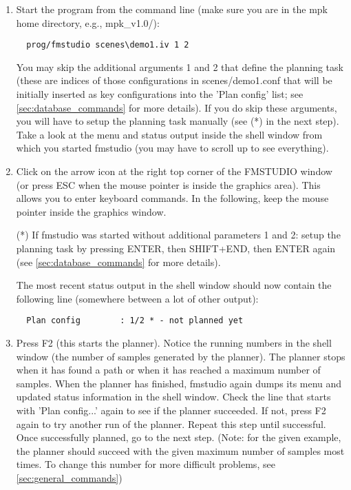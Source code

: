 \documentclass[letter,12pt]{article}
\begin{document}
\begin{enumerate}
  
\item Start the program from the command line (make sure you are in
  the mpk home directory, e.g., mpk_v1.0/):

\begin{verbatim}
  prog/fmstudio scenes\demo1.iv 1 2
\end{verbatim}

You may skip the additional arguments 1 and 2 that define the planning
task (these are indices of those configurations in scenes/demo1.conf
that will be initially inserted as key configurations into the 'Plan
config' list; see \ref{sec:database_commands} for more details).  If
you do skip these arguments, you will have to setup the planning task
manually (see (*) in the next step).  Take a look at the menu and
status output inside the shell window from which you started fmstudio
(you may have to scroll up to see everything).

\item Click on the arrow icon at the right top corner of the FMSTUDIO
  window (or press ESC when the mouse pointer is inside the graphics
  area).  This allows you to enter keyboard commands.  In the
  following, keep the mouse pointer inside the graphics window.
  
  (*) If fmstudio was started without additional parameters 1 and 2:
  setup the planning task by pressing ENTER, then SHIFT+END, then
  ENTER again (see \ref{sec:database_commands} for more details).
  
  The most recent status output in the shell window should now contain
  the following line (somewhere between a lot of other output):
  \begin{verbatim}
  Plan config        : 1/2 * - not planned yet
  \end{verbatim}
  
\item Press F2 (this starts the planner).  Notice the running numbers
  in the shell window (the number of samples generated by the
  planner).  The planner stops when it has found a path or when it has
  reached a maximum number of samples.  When the planner has finished,
  fmstudio again dumps its menu and updated status information in the
  shell window.  Check the line that starts with 'Plan config...'
  again to see if the planner succeeded.  If not, press F2 again to
  try another run of the planner.  Repeat this step until successful.
  Once successfully planned, go to the next step. (Note: for the given
  example, the planner should succeed with the given maximum number of
  samples most times.  To change this number for more difficult
  problems, see \ref{sec:general_commands})
  

\end{enumerate}
\end{document}
